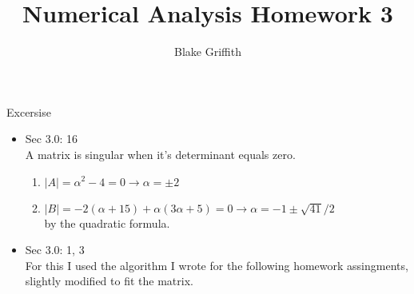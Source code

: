 \documentclass[a4paper]{article}
\title{Numerical Analysis Homework 3}
\author{Blake Griffith}
\begin{document}
\maketitle
\begin{section}{Excersise}
	\begin{itemize}
		\item{Sec 3.0: 16}\\
			A matrix is singular when it's determinant equals zero.
			\begin{enumerate}
				\item \( |A| = \alpha^2 - 4 = 0 \rightarrow \alpha = \pm 2 \)
				\item \( |B| = -2( \alpha + 15) + \alpha ( 3\alpha + 5) = 0 \rightarrow \alpha = - 1 \pm \sqrt{41} / 2 \)\\
					by the quadratic formula.
			\end{enumerate}
		\item{Sec 3.0: 1, 3}\\ 
			For this I used the algorithm I wrote for the following homework assingments, slightly modified to fit the matrix.

	\end{itemize}
\end{section}
\end{document}
